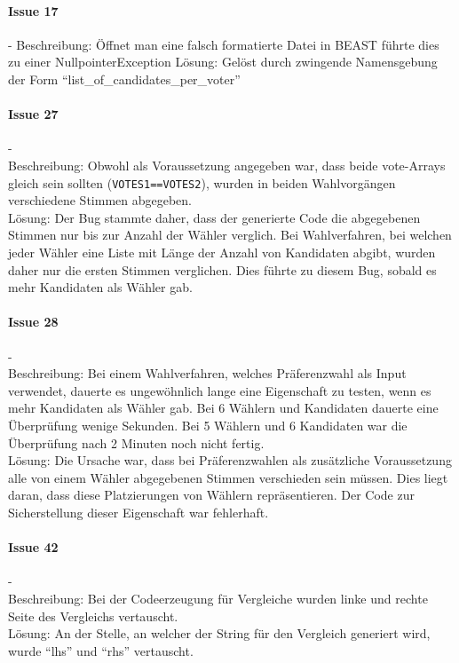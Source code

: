 \documentclass[a4paper]{scrreprt}
\begin{document}
\paragraph{Issue 17}- \newline
Beschreibung: Öffnet man eine falsch formatierte Datei in BEAST führte dies zu
einer NullpointerException
\newline
Lösung: Gelöst durch zwingende Namensgebung der Form
"`list\_of\_candidates\_per\_voter"' 

\paragraph{Issue 27}- \\
Beschreibung: Obwohl als Voraussetzung angegeben war, dass beide vote-Arrays gleich sein sollten (\verb!VOTES1==VOTES2!), wurden in beiden Wahlvorgängen verschiedene Stimmen abgegeben.\\
Lösung: Der Bug stammte daher, dass der generierte Code die abgegebenen Stimmen nur bis zur Anzahl der Wähler verglich. Bei Wahlverfahren, bei welchen jeder Wähler eine Liste mit Länge der Anzahl von Kandidaten abgibt, wurden daher nur die ersten Stimmen verglichen. Dies führte zu diesem Bug, sobald es mehr Kandidaten als Wähler gab.

\paragraph{Issue 28}- \\
Beschreibung: Bei einem Wahlverfahren, welches Präferenzwahl als Input verwendet, dauerte es ungewöhnlich lange eine Eigenschaft zu testen, wenn es mehr Kandidaten als Wähler gab. Bei 6 Wählern und Kandidaten dauerte eine Überprüfung wenige Sekunden. Bei 5 Wählern und 6 Kandidaten war die Überprüfung nach 2 Minuten noch nicht fertig.\\
Lösung: Die Ursache war, dass bei Präferenzwahlen als zusätzliche Voraussetzung alle von einem Wähler abgegebenen Stimmen verschieden sein müssen. Dies liegt daran, dass diese Platzierungen von Wählern repräsentieren. Der Code zur Sicherstellung dieser Eigenschaft war fehlerhaft.

\paragraph{Issue 42}- \\
Beschreibung: Bei der Codeerzeugung für Vergleiche wurden linke und rechte Seite des Vergleichs vertauscht.\\
Lösung: An der Stelle, an welcher der String für den Vergleich generiert wird, wurde "`lhs"' und "`rhs"' vertauscht. 
 
\end{document}
